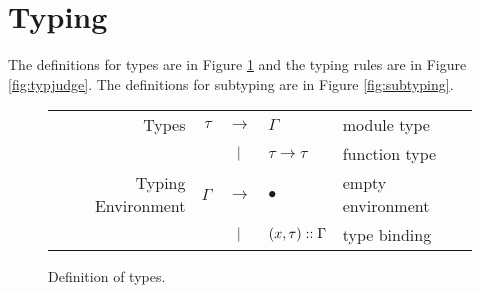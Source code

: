 \section{Typing}
The definitions for types are in Figure \ref{fig:typdom} and the typing rules are in Figure \ref{fig:typjudge}.
The definitions for subtyping are in Figure \ref{fig:subtyping}.

\begin{figure}[h!]
  \centering
  \begin{tabular}{rrcll}
    Types              & $\tau$   & $\rightarrow$ & $\Gamma$               & module type       \\
                       &          & $|$       & $\tau\rightarrow\tau$  & function type     \\
    Typing Environment & $\Gamma$ & $\rightarrow$ & $\bullet$              & empty environment \\
                       &          & $|$       & $(x,\tau):: \Gamma$ & type binding
  \end{tabular}
  \caption{Definition of types.}
  \label{fig:typdom}
\end{figure}

